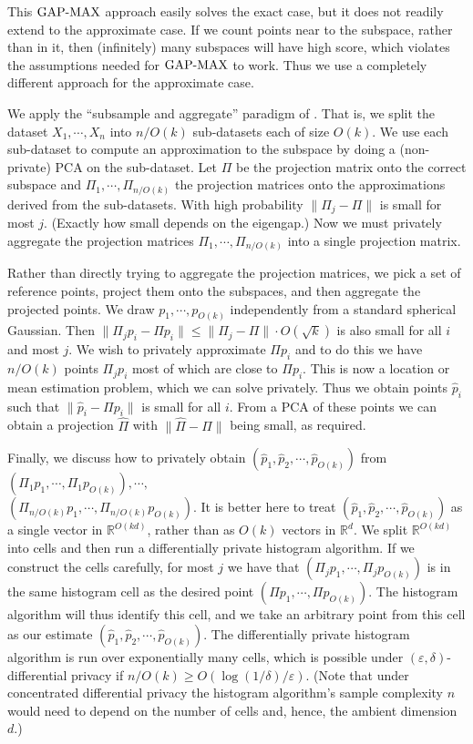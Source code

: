 This $\mathrm{GAP\text{-}MAX}$ approach easily solves the exact case, but it does not readily extend to the approximate case. If we count points near to the subspace, rather than in it, then (infinitely) many subspaces will have high score, which violates the assumptions needed for $\mathrm{GAP\text{-}MAX}$ to work. Thus we use a completely different approach for the approximate case.

We apply the ``subsample and aggregate'' paradigm of \cite{NissimRS07}. That is, we split the dataset $X_1, \cdots, X_n$ into $n/O(k)$ sub-datasets each of size $O(k)$. We use each sub-dataset to compute an approximation to the subspace by doing a (non-private) PCA on the sub-dataset. Let $\Pi$ be the projection matrix onto the correct subspace and $\Pi_1, \cdots, \Pi_{n/O(k)}$ the projection matrices onto the approximations derived from the sub-datasets. With high probability $\|\Pi_j-\Pi\|$ is small for most $j$. (Exactly how small depends on the eigengap.) Now we must privately aggregate the projection matrices $\Pi_1, \cdots, \Pi_{n/O(k)}$ into a single projection matrix.

Rather than directly trying to aggregate the projection matrices, we pick a set of reference points, project them onto the subspaces, and then aggregate the projected points. We draw $p_1, \cdots, p_{O(k)}$ independently from a standard spherical Gaussian. Then $\|\Pi_j p_i - \Pi p_i \| \le \|\Pi_j - \Pi\| \cdot O(\sqrt{k})$ is also small for all $i$ and most $j$. We wish to privately approximate $\Pi p_i$ and to do this we have $n/O(k)$ points $\Pi_j p_i$ most of which are close to $\Pi p_i$. This is now a location or mean estimation problem, which we can solve privately. Thus we obtain points $\hat p_i$ such that $\|\hat p_i - \Pi p_i\|$ is small for all $i$. From a PCA of these points we can obtain a projection $\hat\Pi$ with $\|\hat\Pi-\Pi\|$ being small, as required.

Finally, we discuss how to privately obtain $(\hat p_1, \hat p_2, \cdots, \hat p_{O(k)})$ from $(\Pi_1 p_1, \cdots, \Pi_1 p_{O(k)}), \cdots,$\\$(\Pi_{n/O(k)} p_1, \cdots, \Pi_{n/O(k)} p_{O(k)})$. It is better here to treat $(\hat p_1, \hat p_2, \cdots, \hat p_{O(k)})$ as a single vector in $\mathbb{R}^{O(kd)}$, rather than as $O(k)$ vectors in $\mathbb{R}^d$. We split $\mathbb{R}^{O(kd)}$ into cells and then run a differentially private histogram algorithm.
If we construct the cells carefully, for most $j$ we have that $(\Pi_j p_1, \cdots, \Pi_j p_{O(k)})$ is in the same histogram cell as the desired point $(\Pi p_1, \cdots, \Pi p_{O(k)})$. The histogram algorithm will thus identify this cell, and we take an arbitrary point from this cell as our estimate $(\hat p_1, \hat p_2, \cdots, \hat p_{O(k)})$. The differentially private histogram algorithm is run over exponentially  many cells, which is possible under $(\varepsilon,\delta)$-differential privacy if $n/O(k) \ge O(\log(1/\delta)/\varepsilon)$. (Note that under concentrated differential privacy the histogram algorithm's sample complexity $n$ would need to depend on the number of cells and, hence, the ambient dimension $d$.)

